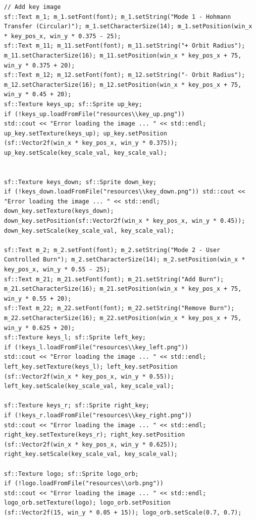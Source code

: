 \documentclass[12pt, letter]{article}
\begin{document}
\begin{verbatim}
// Add key image
sf::Text m_1; m_1.setFont(font); m_1.setString("Mode 1 - Hohmann Transfer (Circular)"); m_1.setCharacterSize(14); m_1.setPosition(win_x * key_pos_x, win_y * 0.375 - 25);
sf::Text m_11; m_11.setFont(font); m_11.setString("+ Orbit Radius");
m_11.setCharacterSize(16); m_11.setPosition(win_x * key_pos_x + 75, win_y * 0.375 + 20);
sf::Text m_12; m_12.setFont(font); m_12.setString("- Orbit Radius");
m_12.setCharacterSize(16); m_12.setPosition(win_x * key_pos_x + 75, win_y * 0.45 + 20);
sf::Texture keys_up; sf::Sprite up_key;
if (!keys_up.loadFromFile("resources\\key_up.png"))
std::cout << "Error loading the image ... " << std::endl;
up_key.setTexture(keys_up); up_key.setPosition
(sf::Vector2f(win_x * key_pos_x, win_y * 0.375)); up_key.setScale(key_scale_val, key_scale_val);


sf::Texture keys_down; sf::Sprite down_key;
if (!keys_down.loadFromFile("resources\\key_down.png")) std::cout << "Error loading the image ... " << std::endl;
down_key.setTexture(keys_down); down_key.setPosition(sf::Vector2f(win_x * key_pos_x, win_y * 0.45)); down_key.setScale(key_scale_val, key_scale_val);

sf::Text m_2; m_2.setFont(font); m_2.setString("Mode 2 - User Controlled Burn"); m_2.setCharacterSize(14); m_2.setPosition(win_x * key_pos_x, win_y * 0.55 - 25);
sf::Text m_21; m_21.setFont(font); m_21.setString("Add Burn"); m_21.setCharacterSize(16); m_21.setPosition(win_x * key_pos_x + 75, win_y * 0.55 + 20);
sf::Text m_22; m_22.setFont(font); m_22.setString("Remove Burn"); m_22.setCharacterSize(16); m_22.setPosition(win_x * key_pos_x + 75, win_y * 0.625 + 20);
sf::Texture keys_l; sf::Sprite left_key;
if (!keys_l.loadFromFile("resources\\key_left.png"))
std::cout << "Error loading the image ... " << std::endl;
left_key.setTexture(keys_l); left_key.setPosition
(sf::Vector2f(win_x * key_pos_x, win_y * 0.55)); left_key.setScale(key_scale_val, key_scale_val);

sf::Texture keys_r; sf::Sprite right_key;
if (!keys_r.loadFromFile("resources\\key_right.png"))
std::cout << "Error loading the image ... " << std::endl;
right_key.setTexture(keys_r); right_key.setPosition
(sf::Vector2f(win_x * key_pos_x, win_y * 0.625)); right_key.setScale(key_scale_val, key_scale_val);

sf::Texture logo; sf::Sprite logo_orb;
if (!logo.loadFromFile("resources\\orb.png")) 
std::cout << "Error loading the image ... " << std::endl;
logo_orb.setTexture(logo); logo_orb.setPosition
(sf::Vector2f(15, win_y * 0.05 + 15)); logo_orb.setScale(0.7, 0.7);


\end{verbatim}
\end{document}
